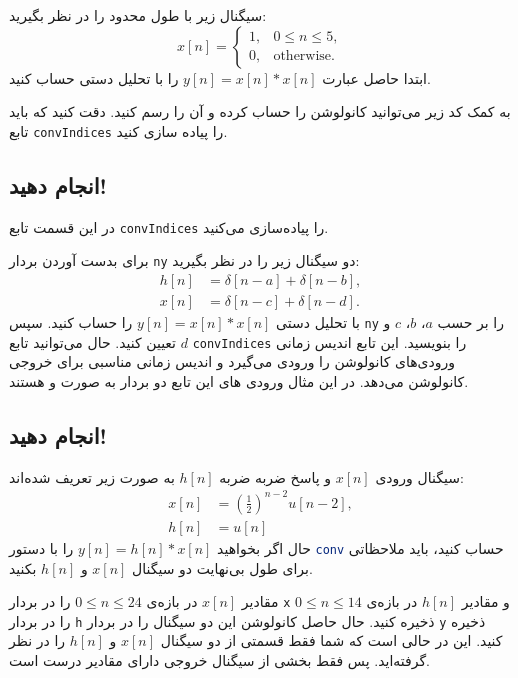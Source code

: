 \documentclass{utsignal}
\begin{document}
	سیگنال زیر با طول محدود را در نظر بگیرید:
	$$
	x[n]=\begin{cases}
		1, & 0 \le n \le 5,\\
		0, & \text{otherwise}.
	\end{cases}
	$$
	ابتدا حاصل عبارت $y[n]=x[n]*x[n]$ را با تحلیل دستی حساب کنید.
	
	به کمک کد زیر می‌توانید کانولوشن را حساب کرده و آن را رسم کنید. دقت کنید که باید تابع \lstinline[language=Octave]{convIndices} را پیاده سازی کنید.
	\begin{latin}
		
	\end{latin}
	
	\subsection{انجام دهید!}
	در این قسمت تابع \lstinline[language=Octave]{convIndices} را پیاده‌سازی می‌کنید.
	
	برای بدست آوردن بردار \lstinline[language=Octave]{ny} دو سیگنال زیر را در نظر بگیرید:
	\begin{align*}
	h[n] &= \delta[n - a] + \delta[n - b],\\
	x[n] &= \delta[n - c] + \delta[n - d].
	\end{align*}
	با تحلیل دستی $y[n]=x[n]*x[n]$ را حساب کنید. سپس \lstinline[language=Octave]{ny} را بر حسب $a$، $b$، $c$ و $d$ تعیین کنید. حال می‌توانید تابع  \lstinline[language=Octave]{convIndices} را بنویسید. این تابع اندیس زمانی ورودی‌های کانولوشن را ورودی می‌گیرد و اندیس زمانی مناسبی برای خروجی کانولوشن می‌دهد. در این مثال ورودی های این تابع دو بردار به صورت  و  هستند.
	\subsection{انجام دهید!}
		سیگنال ورودی $x[n]$ و پاسخ ضربه ضربه $h[n]$ به صورت زیر تعریف شده‌اند:
		\begin{align*}
			x[n] &= \left(\frac{1}{2}\right)^{n-2}u[n-2],\\
			h[n]‌&= u[n]
		\end{align*}
		حال اگر بخواهید $y[n]=h[n]*x[n]$ را با دستور \lstinline[language=Octave]{conv} حساب کنید، باید ملاحظاتی برای طول بی‌نهایت دو سیگنال $x[n]$ و $h[n]$ بکنید.
		
		مقادیر $x[n]$ در بازه‌ی $0\le n\le24$ را در بردار \lstinline[language=Octave]{x} و مقادیر $h[n]$ در بازه‌ی $0\le n\le14$ را در بردار \lstinline[language=Octave]{h} ذخیره کنید. حال حاصل کانولوشن این دو سیگنال را در بردار \lstinline[language=Octave]{y} ذخیره کنید. این در حالی است که شما فقط قسمتی از دو سیگنال $x[n]$ و $h[n]$ را در نظر گرفته‌اید. پس فقط بخشی از سیگنال خروجی دارای مقادیر درست است.
		
\end{document}
